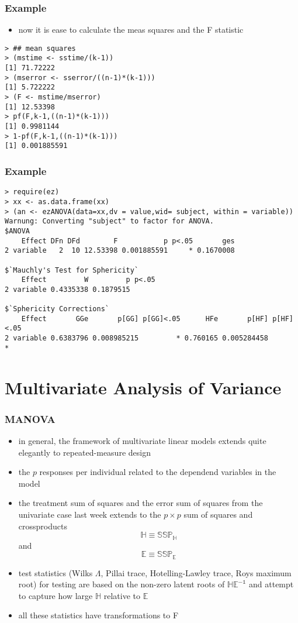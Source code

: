 \begin{frame}\frametitle{Example}
  \begin{itemize}
  \item now it is ease to calculate the meas squares and the F statistic
  \end{itemize}\scriptsize
\begin{verbatim}
> ## mean squares
> (mstime <- sstime/(k-1))
[1] 71.72222
> (mserror <- sserror/((n-1)*(k-1)))
[1] 5.722222
> (F <- mstime/mserror)
[1] 12.53398
> pf(F,k-1,((n-1)*(k-1)))
[1] 0.9981144
> 1-pf(F,k-1,((n-1)*(k-1)))
[1] 0.001885591
\end{verbatim}
\end{frame}

\begin{frame}\frametitle{Example}\scriptsize
\begin{verbatim}
> require(ez)
> xx <- as.data.frame(xx)
> (an <- ezANOVA(data=xx,dv = value,wid= subject, within = variable))
Warnung: Converting "subject" to factor for ANOVA.
$ANOVA
    Effect DFn DFd        F           p p<.05       ges
2 variable   2  10 12.53398 0.001885591     * 0.1670008

$`Mauchly's Test for Sphericity`
    Effect         W         p p<.05
2 variable 0.4335338 0.1879515      

$`Sphericity Corrections`
    Effect       GGe       p[GG] p[GG]<.05      HFe       p[HF] p[HF]<.05
2 variable 0.6383796 0.008985215         * 0.760165 0.005284458         *
\end{verbatim}
\end{frame}


\section{Multivariate Analysis of Variance}
\begin{frame}\frametitle{MANOVA}
  \begin{itemize}
  \item in general, the framework of multivariate linear models extends quite elegantly to repeated-measure design
  \item the $p$ responses per individual related to the dependend variables in the model
  \item the treatment sum of squares and the error sum of squares from the univariate case last week extends to the $p \times p$ sum of squares and crossproducts
$$ \mathbb{H}\equiv \mathbb{SSP_{H}}$$ and $$ \mathbb{E}\equiv \mathbb{SSP_{E}}$$
  \item test statistics (Wilks $\Lambda$, Pillai trace, Hotelling-Lawley trace, Roys maximum root) for testing are based on the non-zero latent roots of $\mathbb{HE^{-1}}$ and attempt to capture how large $\mathbb{H}$ relative to $\mathbb{E}$
  \item all these statistics have transformations to F 
  \end{itemize}
\end{frame}

